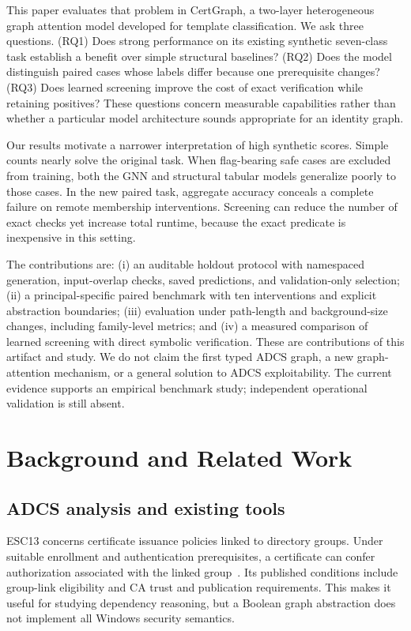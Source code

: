 \documentclass[journal]{IEEEtran}
\begin{document}
This paper evaluates that problem in CertGraph, a two-layer heterogeneous graph attention model developed for template classification. We ask three questions. (RQ1) Does strong performance on its existing synthetic seven-class task establish a benefit over simple structural baselines? (RQ2) Does the model distinguish paired cases whose labels differ because one prerequisite changes? (RQ3) Does learned screening improve the cost of exact verification while retaining positives? These questions concern measurable capabilities rather than whether a particular model architecture sounds appropriate for an identity graph.

Our results motivate a narrower interpretation of high synthetic scores. Simple counts nearly solve the original task. When flag-bearing safe cases are excluded from training, both the GNN and structural tabular models generalize poorly to those cases. In the new paired task, aggregate accuracy conceals a complete failure on remote membership interventions. Screening can reduce the number of exact checks yet increase total runtime, because the exact predicate is inexpensive in this setting.

The contributions are: (i) an auditable holdout protocol with namespaced generation, input-overlap checks, saved predictions, and validation-only selection; (ii) a principal-specific paired benchmark with ten interventions and explicit abstraction boundaries; (iii) evaluation under path-length and background-size changes, including family-level metrics; and (iv) a measured comparison of learned screening with direct symbolic verification. These are contributions of this artifact and study. We do not claim the first typed ADCS graph, a new graph-attention mechanism, or a general solution to ADCS exploitability. The current evidence supports an empirical benchmark study; independent operational validation is still absent.

\section{Background and Related Work}
\subsection{ADCS analysis and existing tools}
ESC13 concerns certificate issuance policies linked to directory groups. Under suitable enrollment and authentication prerequisites, a certificate can confer authorization associated with the linked group~\cite{esc13}. Its published conditions include group-link eligibility and CA trust and publication requirements. This makes it useful for studying dependency reasoning, but a Boolean graph abstraction does not implement all Windows security semantics.
\end{document}
